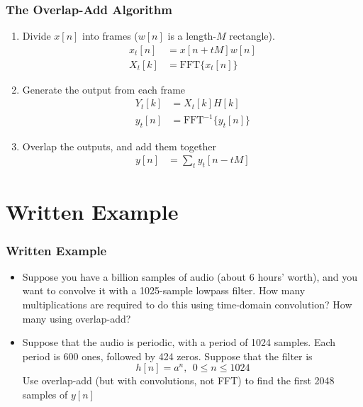\documentclass{beamer}
\begin{document}
\begin{frame}
  \frametitle{The Overlap-Add Algorithm}

  \begin{enumerate}
    \item Divide $x[n]$ into frames ($w[n]$ is a length-$M$ rectangle).
      \begin{align*}
        x_t[n] &= x[n+tM]w[n]\\
        X_t[k] &= \text{FFT}\{x_t[n]\}
      \end{align*}
    \item Generate the output from each frame
      \begin{align*}
        Y_t[k] &= X_t[k]H[k]\\
        y_t[n] &= \text{FFT}^{-1}\{y_t[n]\}
      \end{align*}
    \item  Overlap the outputs, and add them together
      \begin{align*}
        y[n] &= \sum_t y_t[n-tM]
      \end{align*}
  \end{enumerate}
\end{frame}

\section[Example]{Written Example}
\setcounter{subsection}{1}

\begin{frame}
  \frametitle{Written Example}

  \begin{itemize}
  \item Suppose you have a billion samples of audio (about 6 hours'
    worth), and you want to convolve it with a 1025-sample lowpass
    filter.  How many multiplications are required to do this using
    time-domain convolution?  How many using overlap-add?
  \item Suppose that the audio is periodic, with a period of 1024 samples.
    Each period is 600 ones, followed by 424 zeros.
    Suppose that the filter is
    \[
    h[n] = a^n,~~0\le n\le 1024
    \]
    Use overlap-add (but with convolutions, not FFT) to find the first 2048 samples of $y[n]$
  \end{itemize}
\end{frame}
\end{document}
